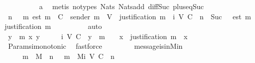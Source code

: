 \begin{isabellebody}
\ \ \ \ \ \ \ \ \isamarkupfalse%
\ a{}\ \isamarkupfalse%
\ {\isacharparenleft}metis\ {\isacharparenleft}no{\isacharunderscore}types{\isacharparenright}\ Nats{\isacharunderscore}{}\ Nats{\isacharunderscore}add\ diff{\isacharunderscore}Suc{\isacharunderscore}{}\ plus{\isacharunderscore}{}{\isacharunderscore}eq{\isacharunderscore}Suc{\isacharparenright}\isanewline
\ \ \ \ \ \ \isamarkupfalse%
\ \isamarkupfalse%
\ {\isachardoublequoteopen}{\isasymexists}n{\isasymin}{\isasymnat}{\isachardot}\ {\isasymsigma}\ {\isasymsubseteq}\ {\isacharbraceleft}m{\isachardot}\ est\ m\ {\isasymin}\ C\ {\isasymand}\ sender\ m\ {\isasymin}\ V\ {\isasymand}\ justification\ m\ {\isasymin}\ {\isasymSigma}i\ {\isacharparenleft}V{\isacharcomma}\ C{\isacharcomma}\ {\isasymepsilon}{\isacharparenright}\ {\isacharparenleft}n\ {\isacharminus}\ Suc\ {}{\isacharparenright}\ {\isasymand}\ est\ m\ {\isasymin}\ {\isasymepsilon}\ {\isacharparenleft}justification\ m{\isacharparenright}{\isacharbraceright}{\isachardoublequoteclose}\isanewline
\ \ \ \ \ \ \ \ \isamarkupfalse%
\ auto\isanewline
\ \ \ \ \isamarkupfalse%
\ \isanewline
\ \ \ \ \ \ \isamarkupfalse%
\ {\isachardoublequoteopen}{\isasymAnd}y\ {\isasymsigma}\ m\ x{\isachardot}\ y\ {\isasymin}\ {\isasymnat}\ {\isasymLongrightarrow}\ {\isasymsigma}\ {\isasymin}\ {\isasymSigma}i\ {\isacharparenleft}V{\isacharcomma}\ C{\isacharcomma}\ {\isasymepsilon}{\isacharparenright}\ y\ {\isasymLongrightarrow}\ m\ {\isasymin}\ {\isasymsigma}\ {\isasymLongrightarrow}\ x\ {\isasymin}\ justification\ m\ {\isasymLongrightarrow}\ x\ {\isasymin}\ {\isasymsigma}{\isachardoublequoteclose}\isanewline
\ \ \ \ \ \ \ \ \isamarkupfalse%
\ Params{\isachardot}{\isasymSigma}i{\isacharunderscore}monotonic\ \isamarkupfalse%
\ fastforce\isanewline
\ \ \ \ \isamarkupfalse%
%
\endisatagproof
{\isafoldproof}%
%
\isadelimproof
\isanewline
%
\endisadelimproof
\isanewline
\ \ \isamarkupfalse%
\ message{\isacharunderscore}is{\isacharunderscore}in{\isacharunderscore}Mi{\isacharunderscore}n\ {\isacharcolon}\isanewline
\ \ \ \ {\isachardoublequoteopen}{\isasymforall}\ m\ {\isasymin}\ M{\isachardot}\ {\isasymexists}\ n\ {\isasymin}\ {\isasymnat}{\isachardot}\ m\ {\isasymin}\ Mi\ {\isacharparenleft}V{\isacharcomma}\ C{\isacharcomma}\ {\isasymepsilon}{\isacharparenright}\ n{\isachardoublequoteclose}\isanewline
%
\isadelimproof
\ \ \ \ %
\endisadelimproof

\end{isabellebody}
